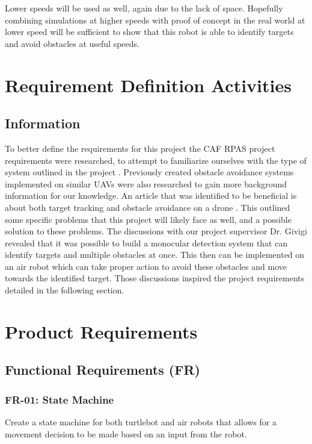 \documentclass{article}
\begin{document}
	Lower speeds will be used as well, again due to the lack of space. Hopefully combining simulations at higher speeds with proof of concept in the real world at lower speed will be sufficient to show that this robot is able to identify targets and avoid obstacles at useful speeds.

\section{Requirement Definition Activities}

	\subsection{Information}
	
	To better define the requirements for this project the CAF RPAS project requirements were researched, to attempt to familiarize ourselves with the type of system outlined in the project \cite{RPAS}. Previously created obstacle avoidance systems implemented on similar UAVs were also researched to gain more background information for our knowledge. An article that was identified to be beneficial is about both target tracking and obstacle avoidance on a drone \cite{woods2015dynamic}. This outlined some specific problems that this project will likely face as well, and a possible solution to these problems. 
	The discussions with our project supervisor Dr. Givigi revealed that it was possible to build a monocular detection system that can identify targets and multiple obstacles at once. This then can be implemented on an air robot which can take proper action to avoid these obstacles and move towards the identified target. Those discussions inspired the project requirements detailed in the following section.

\section{Product Requirements}

	\subsection{Functional Requirements (FR)}
	
		\subsubsection{FR-01: State Machine}
		Create a state machine for both turtlebot and air robots that allows for a movement decision to be made based on an input from the robot. 
		
\end{document}
